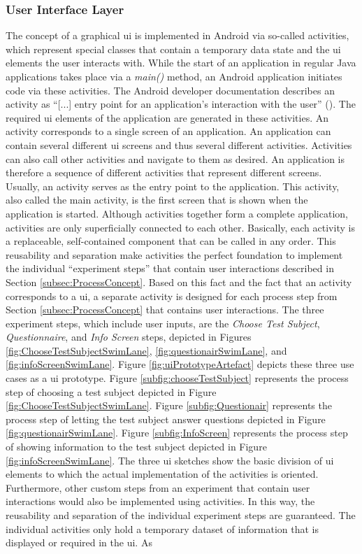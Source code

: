 \subsubsection{User Interface Layer}

The concept of a graphical \ac{ui} is implemented in Android via so-called activities, which represent special classes that contain a temporary data state and the \ac{ui} elements the user interacts with. While the start of an application in regular Java applications takes place via a \textit{main()} method, an Android application initiates code via these activities. The Android developer documentation describes an activity as \enquote{[...] entry point for an application's interaction with the user} (\cite{Google.2023}). The required \ac{ui} elements of the application are generated in these activities. An activity corresponds to a single screen of an application. An application can contain several different \ac{ui} screens and thus several different activities. Activities can also call other activities and navigate to them as desired. An application is therefore a sequence of different activities that represent different screens. Usually, an activity serves as the entry point to the application. This activity, also called the main activity, is the first screen that is shown when the application is started. Although activities together form a complete application, activities are only superficially connected to each other. Basically, each activity is a replaceable, self-contained component that can be called in any order. This reusability and separation make activities the perfect foundation to implement the individual \enquote{experiment steps} that contain user interactions described in Section \ref{subsec:ProcessConcept}. Based on this fact and the fact that an activity corresponds to a \ac{ui}, a separate activity is designed for each process step from Section \ref{subsec:ProcessConcept} that contains user interactions. The three experiment steps, which include user inputs, are the \textit{Choose Test Subject}, \textit{Questionnaire}, and \textit{Info Screen} steps, depicted in Figures \ref{fig:ChooseTestSubjectSwimLane}, \ref{fig:questionairSwimLane}, and \ref{fig:infoScreenSwimLane}. Figure \ref{fig:uiPrototypeArtefact} depicts these three use cases as a \ac{ui} prototype. Figure \ref{subfig:chooseTestSubject} represents the process step of choosing a test subject depicted in Figure \ref{fig:ChooseTestSubjectSwimLane}. Figure \ref{subfig:Questionair} represents the process step of letting the test subject answer questions depicted in Figure \ref{fig:questionairSwimLane}. Figure \ref{subfig:InfoScreen} represents the process step of showing information to the test subject depicted in Figure \ref{fig:infoScreenSwimLane}. The three \ac{ui} sketches show the basic division of \ac{ui} elements to which the actual implementation of the activities is oriented. Furthermore, other custom steps from an experiment that contain user interactions would also be implemented using activities. In this way, the reusability and separation of the individual experiment steps are guaranteed. The individual activities only hold a temporary dataset of information that is displayed or required in the \ac{ui}. As 